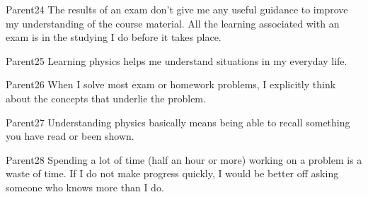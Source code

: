 \begin{question}{Parent24}
    \QuestionIndicative
    The results of an exam don't give me any useful guidance to
        improve my understanding of the course material.
    All the learning associated with an exam is in the studying
        I do before it takes place.
    \begin{choiceshoriz}[o]
    \end{choiceshoriz}
\end{question}

\begin{question}{Parent25}
    \QuestionIndicative
    Learning physics helps me understand situations in my everyday life.
    \begin{choiceshoriz}[o]
    \end{choiceshoriz}
\end{question}

\begin{question}{Parent26}
    \QuestionIndicative
    When I solve most exam or homework problems, I explicitly think
        about the concepts that underlie the problem.
    \begin{choiceshoriz}[o]
    \end{choiceshoriz}
\end{question}

\begin{question}{Parent27}
    \QuestionIndicative
    Understanding physics basically means being able to recall
        something you have read or been shown.
    \begin{choiceshoriz}[o]
    \end{choiceshoriz}
\end{question}

\begin{question}{Parent28}
    \QuestionIndicative
    Spending a lot of time (half an hour or more) working on a
        problem is a waste of time.
    If I do not make progress quickly, I would be better off asking
        someone who knows more than I do.
    \begin{choiceshoriz}[o]
    \end{choiceshoriz}
\end{question}

